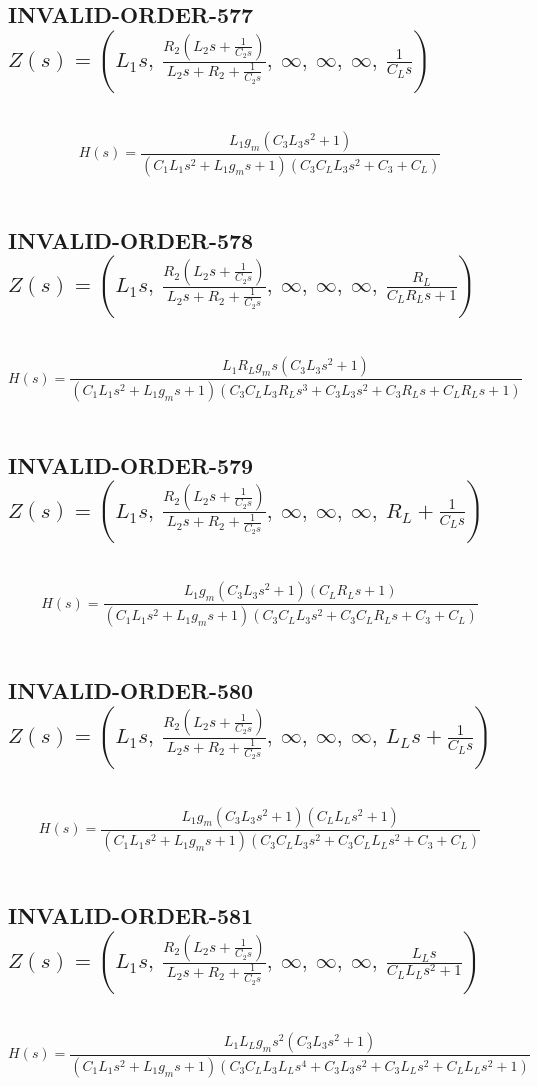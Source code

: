 \documentclass{article}
\begin{document}
\subsection{INVALID-ORDER-577 $Z(s) = \left( L_{1} s, \  \frac{R_{2} \left(L_{2} s + \frac{1}{C_{2} s}\right)}{L_{2} s + R_{2} + \frac{1}{C_{2} s}}, \  \infty, \  \infty, \  \infty, \  \frac{1}{C_{L} s}\right)$ } \ 
\textbf{\[H(s) = \frac{L_{1} g_{m} \left(C_{3} L_{3} s^{2} + 1\right)}{\left(C_{1} L_{1} s^{2} + L_{1} g_{m} s + 1\right) \left(C_{3} C_{L} L_{3} s^{2} + C_{3} + C_{L}\right)}\] } \ 
\subsection{INVALID-ORDER-578 $Z(s) = \left( L_{1} s, \  \frac{R_{2} \left(L_{2} s + \frac{1}{C_{2} s}\right)}{L_{2} s + R_{2} + \frac{1}{C_{2} s}}, \  \infty, \  \infty, \  \infty, \  \frac{R_{L}}{C_{L} R_{L} s + 1}\right)$ } \ 
\textbf{\[H(s) = \frac{L_{1} R_{L} g_{m} s \left(C_{3} L_{3} s^{2} + 1\right)}{\left(C_{1} L_{1} s^{2} + L_{1} g_{m} s + 1\right) \left(C_{3} C_{L} L_{3} R_{L} s^{3} + C_{3} L_{3} s^{2} + C_{3} R_{L} s + C_{L} R_{L} s + 1\right)}\] } \ 
\subsection{INVALID-ORDER-579 $Z(s) = \left( L_{1} s, \  \frac{R_{2} \left(L_{2} s + \frac{1}{C_{2} s}\right)}{L_{2} s + R_{2} + \frac{1}{C_{2} s}}, \  \infty, \  \infty, \  \infty, \  R_{L} + \frac{1}{C_{L} s}\right)$ } \ 
\textbf{\[H(s) = \frac{L_{1} g_{m} \left(C_{3} L_{3} s^{2} + 1\right) \left(C_{L} R_{L} s + 1\right)}{\left(C_{1} L_{1} s^{2} + L_{1} g_{m} s + 1\right) \left(C_{3} C_{L} L_{3} s^{2} + C_{3} C_{L} R_{L} s + C_{3} + C_{L}\right)}\] } \ 
\subsection{INVALID-ORDER-580 $Z(s) = \left( L_{1} s, \  \frac{R_{2} \left(L_{2} s + \frac{1}{C_{2} s}\right)}{L_{2} s + R_{2} + \frac{1}{C_{2} s}}, \  \infty, \  \infty, \  \infty, \  L_{L} s + \frac{1}{C_{L} s}\right)$ } \ 
\textbf{\[H(s) = \frac{L_{1} g_{m} \left(C_{3} L_{3} s^{2} + 1\right) \left(C_{L} L_{L} s^{2} + 1\right)}{\left(C_{1} L_{1} s^{2} + L_{1} g_{m} s + 1\right) \left(C_{3} C_{L} L_{3} s^{2} + C_{3} C_{L} L_{L} s^{2} + C_{3} + C_{L}\right)}\] } \ 
\subsection{INVALID-ORDER-581 $Z(s) = \left( L_{1} s, \  \frac{R_{2} \left(L_{2} s + \frac{1}{C_{2} s}\right)}{L_{2} s + R_{2} + \frac{1}{C_{2} s}}, \  \infty, \  \infty, \  \infty, \  \frac{L_{L} s}{C_{L} L_{L} s^{2} + 1}\right)$ } \ 
\textbf{\[H(s) = \frac{L_{1} L_{L} g_{m} s^{2} \left(C_{3} L_{3} s^{2} + 1\right)}{\left(C_{1} L_{1} s^{2} + L_{1} g_{m} s + 1\right) \left(C_{3} C_{L} L_{3} L_{L} s^{4} + C_{3} L_{3} s^{2} + C_{3} L_{L} s^{2} + C_{L} L_{L} s^{2} + 1\right)}\] } \ 
\end{document}
